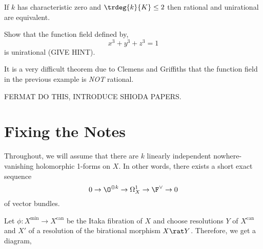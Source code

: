 \documentclass[12pt]{article}
\begin{document}
If $k$ has characteristic zero and $\trdeg{k}{K} \le 2$ then rational and unirational are equivalent. 


\begin{exercise}
Show that the function field defined by,
\[ x^3 + y^3 + z^3 = 1 \]
is unirational (GIVE HINT).
\end{exercise}

It is a very difficult theorem due to Clemens and Griffiths that the function field in the previous example is \textit{NOT} rational.


\begin{example}
FERMAT DO THIS, INTRODUCE SHIODA PAPERS.
\end{example}

\section{Fixing the Notes}

\newcommand{\can}{\mathrm{can}}


Throughout, we will assume that there are $k$ linearly independent nowhere-vanishing holomorphic 1-forms on $X$. In other words, there exists a short exact sequence
\[ 0 \rightarrow \O^{\oplus k} \rightarrow \Omega_{X}^{1} \rightarrow \F^{\vee} \rightarrow 0 \]
of vector bundles. 

Let $\phi : X^{\min} \to X^{\can}$ be the Itaka fibration of $X$ and choose resolutions $Y$ of $X^{\can}$ and $X'$ of a resolution of the birational morphism $X \rat Y$. Therefore, we get a diagram,
\end{document}
